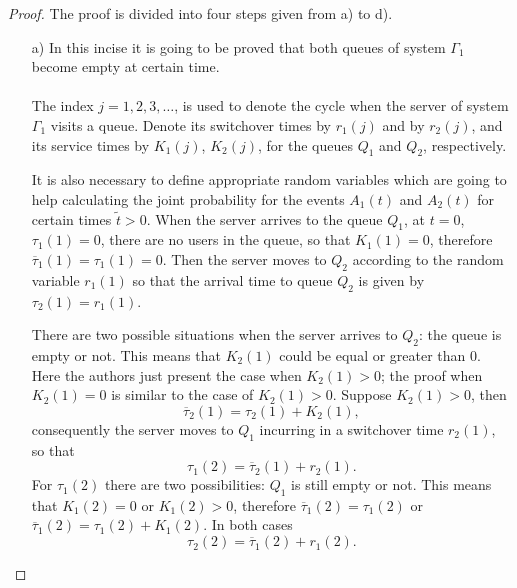 \begin{proof}
The proof is divided into four steps given from a) to d).
\begin{itemize}
\item[a) ] 
In this incise it is going to be proved that both queues of system $\Gamma_{1}$ become empty at certain time. \\\\
The index $j=1,2,3,\ldots$, is used to denote the cycle when the server of system $\Gamma_{1}$ visits a queue. Denote its switchover times  by $r_{1}\left(j\right)$ and by $r_{2}\left(j\right)$, and its service times by $K_{1}\left(j\right)$, $K_{2}\left(j\right)$, for the queues $Q_{1}$ and $Q_{2}$,  respectively.\medskip

It is also necessary to define appropriate random variables which are going to help calculating the joint probability for the events $A_{1}\left(t\right)$ and $A_{2}\left(t\right)$ for certain times $\tilde{t}>0$. When the server arrives to the queue $Q_{1}$, at $t=0$, $\tau_{1}\left(1\right)=0$, there are no users in the queue, so that $K_{1}\left(1\right)=0$, therefore $\overline{\tau}_{1}\left(1\right)=\tau_{1}\left(1\right)=0$. Then the server moves to $Q_{2}$ according to the random variable $r_{1}\left(1\right)$ so that the arrival time to queue $Q_{2}$ is given by $\tau_{2}\left(1\right)=r_{1}\left(1\right)$.\medskip

There are two  possible situations when the server arrives to $Q_{2}$: the queue is empty or not. This means that $K_{2}\left(1\right)$ could be equal or greater than $0$. Here the authors just present the case when $K_{2}\left(1\right)>0$; the proof when $ K_{2}\left(1\right)=0$ is similar to the case of $K_{2}\left(1\right)>0$. Suppose $K_{2}\left(1\right)>0$, then $$\overline{\tau}_{2}\left(1\right)=\tau_{2}\left(1\right)+K_{2}\left(1\right),$$ consequently the server moves to $Q_{1}$ incurring in a switchover time $r_{2}\left(1\right)$, so that $$\tau_{1}\left(2\right)=\overline{\tau}_{2}\left(1\right)+r_{2}\left(1\right).$$
For $\tau_{1}\left(2\right)$ there are two possibilities: $Q_{1}$ is still empty or not. This means that $K_{1}\left(2\right)=0$ or $K_{1}\left(2\right)>0$, therefore $\overline{\tau}_{1}\left(2\right)=\tau_{1}\left(2\right)$ or  $\overline{\tau}_{1}\left(2\right)=\tau_{1}\left(2\right)+K_{1}\left(2\right)$. In both cases $$\tau_{2}\left(2\right)=\overline{\tau}_{1}\left(2\right)+r_{1}\left(2\right).$$


\end{itemize}
\end{proof}
